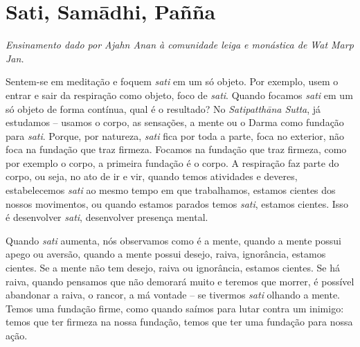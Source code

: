 
\chapter{Sati, Samādhi, Pañña}

{\itshape
Ensinamento dado por Ajahn Anan à comunidade leiga e monástica de Wat
Marp Jan.}

Sentem-se em meditação e foquem \textit{sati} em um só objeto. Por
exemplo, usem o entrar e sair da respiração como objeto, foco de
\textit{sati}. Quando focamos \textit{sati} em um só objeto de forma
contínua, qual é o resultado? No \textit{Satipatthāna Sutta}, já
estudamos – usamos o corpo, as sensações, a mente ou o Darma como
fundação para \textit{sati}. Porque, por natureza, \textit{sati} fica
por toda a parte, foca no exterior, não foca na fundação que traz
firmeza. Focamos na fundação que traz firmeza, como por exemplo o
corpo, a primeira fundação é o corpo. A respiração faz parte do corpo,
ou seja, no ato de ir e vir, quando temos atividades e deveres,
estabelecemos \textit{sati} ao mesmo tempo em que trabalhamos, estamos
cientes dos nossos movimentos, ou quando estamos parados temos
\textit{sati}, estamos cientes. Isso é desenvolver \textit{sati},
desenvolver presença mental. 

Quando \textit{sati} aumenta, nós observamos como é a mente, quando
a mente possui apego ou aversão, quando a mente possui desejo, raiva,
ignorância, estamos cientes. Se a mente não tem desejo, raiva ou
ignorância, estamos cientes. Se há raiva, quando pensamos que não
demorará muito e teremos que morrer, é possível abandonar a raiva, o
rancor, a má vontade – se tivermos \textit{sati} olhando a mente. Temos
uma fundação firme, como quando saímos para lutar contra um inimigo:
temos que ter firmeza na nossa fundação, temos que ter uma fundação
para nossa ação. 

